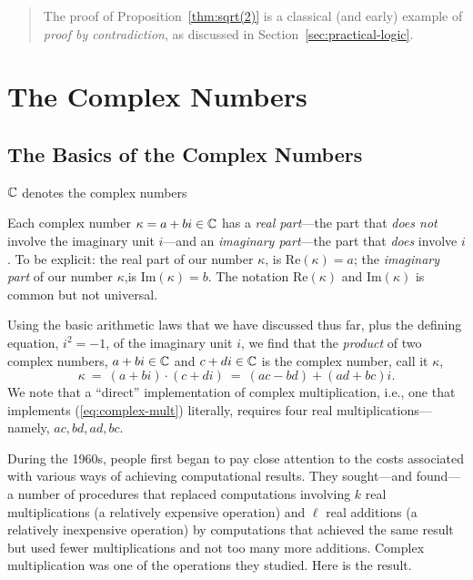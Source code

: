 \begin{quote}
The proof of Proposition~\ref{thm:sqrt(2)} is a classical (and early)
example of {\em proof by contradiction}, as discussed in
Section~\ref{sec:practical-logic}.
\end{quote}



\section{The Complex Numbers}
\label{sec:complexes}


\subsection{The Basics of the Complex Numbers}

$\mathbb{C}$ denotes the complex numbers

Each complex number $\kappa = a+bi \in \mathbb{C}$ has a {\it real part}---the
part that {\em does not} involve the imaginary unit $i$---and an {\it
  imaginary part}---the part that {\em does} involve $i$.  To be
explicit: the real part of our number $\kappa$, is Re$(\kappa) = a$;
the {\it imaginary part} of our number $\kappa$,is Im$(\kappa) = b$.
The notation Re$(\kappa)$ and Im$(\kappa)$ is common but not
universal.

Using the basic arithmetic laws that we have discussed thus far, plus
the defining equation, $i^2 = -1$, of the imaginary unit $i$, we find
that the {\em product} of two complex numbers, $a+bi \in \mathbb{C}$ and $c+di
\in \mathbb{C}$ is the complex number, call it $\kappa$,
\begin{equation}
\label{eq:complex-mult}
\kappa \ = \ (a+bi) \cdot (c+di) \ = \ (ac - bd) + (ad + bc)i.
\end{equation}
We note that a ``direct'' implementation of complex multiplication,
i.e., one that implements (\ref{eq:complex-mult}) literally, requires
four real multiplications---namely, $ac, bd, ad, bc$.

During the 1960s, people first began to pay close attention to the
costs associated with various ways of achieving computational results.
They sought---and found---a number of procedures that replaced
computations involving $k$ real multiplications (a relatively
expensive operation) and $\ell$ real additions (a relatively
inexpensive operation) by computations that achieved the same result
but used fewer multiplications and not too many more additions.
Complex multiplication was one of the operations they studied.  Here
is the result.

